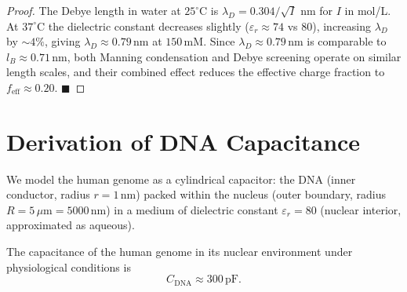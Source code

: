 \begin{proof}
The Debye length in water at $25^\circ$C is $\lambda_D = 0.304/\sqrt{I}$
nm for $I$ in mol/L. At $37^\circ$C the dielectric constant decreases
slightly ($\varepsilon_r \approx 74$ vs 80), increasing $\lambda_D$ by
$\sim 4\%$, giving $\lambda_D \approx 0.79\,\mathrm{nm}$ at
$150\,\mathrm{mM}$. Since $\lambda_D \approx 0.79\,\mathrm{nm}$ is
comparable to $l_B \approx 0.71\,\mathrm{nm}$, both Manning condensation
and Debye screening operate on similar length scales, and their combined
effect reduces the effective charge fraction to $f_{\mathrm{eff}} \approx 0.20$. $\blacksquare$
\end{proof}

\section{Derivation of DNA Capacitance}
\label{sec:capacitance_derivation}

We model the human genome as a cylindrical capacitor: the DNA (inner
conductor, radius $r = 1\,\mathrm{nm}$) packed within the nucleus (outer
boundary, radius $R = 5\,\mu\mathrm{m} = 5000\,\mathrm{nm}$) in a medium
of dielectric constant $\varepsilon_r = 80$ (nuclear interior, approximated
as aqueous).

\begin{theorem}
\label{thm:capacitance}
The capacitance of the human genome in its nuclear environment under
physiological conditions is
\begin{equation}
  C_{\mathrm{DNA}} \approx 300\,\mathrm{pF}.
  \label{eq:C_DNA}
\end{equation}
\end{theorem}


